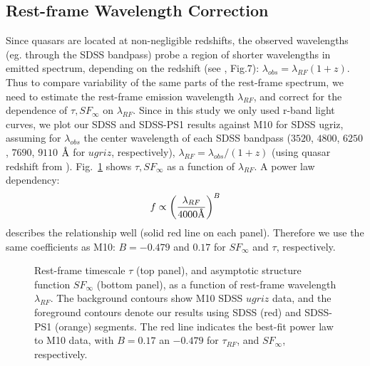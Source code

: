 \documentclass[twocolumn]{aastex62}
\let\oldAA\AA
\renewcommand{\AA}{\text{\normalfont\oldAA}}
\newcommand{\project}[1]{\textsf{#1}}
\begin{document}
\begin{figure*} %
\caption{Results of \project{celerite} fits with real data (left) and simulated data where $\tau_{in}=575 $days and  $SF_{\infty} = 0.2$ (right). There is no major change of shape of distribution with magnitude. } 
\label{fig:tau_sigma_ratios}
\end{figure*}



\subsection{Rest-frame Wavelength Correction}
Since quasars are located at non-negligible redshifts, the observed wavelengths (eg. through the SDSS bandpass) probe a region of shorter wavelengths in emitted spectrum, depending on the redshift (see \citealt{shen2018}, Fig.7):  $\lambda_{obs} = \lambda_{RF}  (1+z)$. Thus to compare variability of the same parts of the rest-frame spectrum, we need to estimate the rest-frame emission wavelength $\lambda_{RF}$, and correct for the dependence of $\tau, SF_{\infty}$ on $\lambda_{RF}$. Since in this study we only used r-band light curves,  we plot our SDSS and SDSS-PS1 results against M10 for SDSS ugriz, assuming for $\lambda_{obs}$ the center wavelength of each SDSS bandpass ($3520$, $4800$, $6250$, $7690$, $9110$ $\mbox{\AA}$ for $ugriz$, respectively), $\lambda_{RF} = \lambda_{obs} / (1+z)$ (using quasar redshift from \citealt{schneider2010}). Fig.~\ref{fig:wavelength_dependence} shows $\tau, SF_{\infty}$  as a function of  $\lambda_{RF}$. A power law dependency:
\begin{equation}
f \propto \left( \frac{\lambda_{RF}}{4000 \mbox{\AA}} \right)^{B}
\end{equation}
describes the relationship well (solid red line on each panel). Therefore we use the same coefficients as M10: $B=-0.479$ and $0.17$ for $SF_{\infty}$ and $\tau$, respectively.

  
\begin{figure} %
\caption{Rest-frame timescale $\tau$ (top panel), and asymptotic structure function $SF_{\infty}$ (bottom panel), as a function of rest-frame wavelength $\lambda_{RF}$. The background contours show M10 SDSS $ugriz$ data, and the foreground contours  denote our results using  SDSS (red) and SDSS-PS1 (orange) segments. The red line indicates the best-fit power law to M10 data, with $B=0.17$ an $-0.479$ for $\tau_{RF}$, and $SF_{\infty}$, respectively.}
\label{fig:wavelength_dependence}
\end{figure} 
\end{document}
